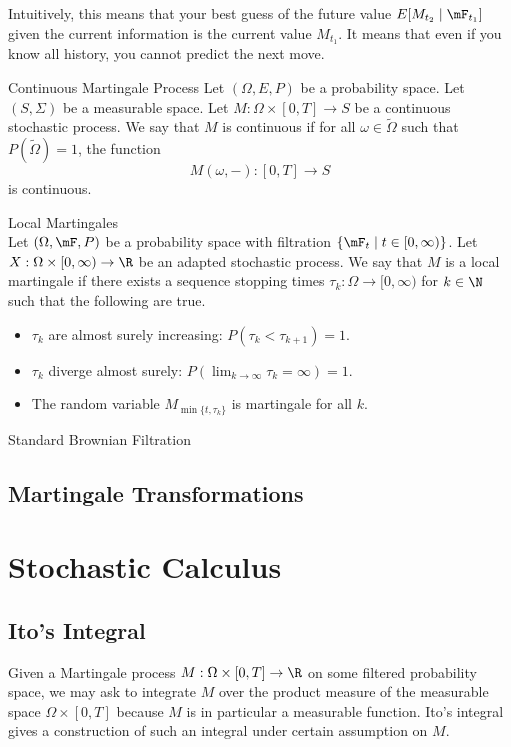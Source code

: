 \documentclass[a4paper]{article}
\begin{document}
Intuitively, this means that your best guess of the future value $E[M_{t_2}\;|\;\mF_{t_1}]$ given the current information is the current value $M_{t_1}$. It means that even if you know all history, you cannot predict the next move. 

\begin{defn}{Continuous Martingale Process}{} Let $(\Omega,E,P)$ be a probability space. Let $(S,\Sigma)$ be a measurable space. Let $M:\Omega\times[0,T]\to S$ be a continuous stochastic process. We say that $M$ is continuous if for all $\omega\in\widetilde{\Omega}$ such that $P(\widetilde{\Omega})=1$, the function $$M(\omega,-):[0,T]\to S$$ is continuous. 
\end{defn}

\begin{defn}{Local Martingales}{}\\
Let $(\Omega,\mF,P)$ be a probability space with filtration $\{\mF_t\;|\;t\in[0,\infty)\}$. Let $X:\Omega\times[0,\infty)\to\R$ be an adapted stochastic process. We say that $M$ is a local martingale if there exists a sequence stopping times $\tau_k:\Omega\to[0,\infty)$ for $k\in\N$ such that the following are true. 
\begin{itemize}
\item $\tau_k$ are almost surely increasing: $P(\tau_k<\tau_{k+1})=1$. 
\item $\tau_k$ diverge almost surely: $P(\lim_{k\to\infty}\tau_k=\infty)=1$. 
\item The random variable $M_{\min\{t,\tau_k\}}$ is martingale for all $k$. 
\end{itemize}
\end{defn}

\begin{defn}{Standard Brownian Filtration}{}
\end{defn}

\subsection{Martingale Transformations}

\pagebreak
\section{Stochastic Calculus}
\subsection{Ito's Integral}
Given a Martingale process $M:\Omega\times[0,T]\to\R$ on some filtered probability space, we may ask to integrate $M$ over the product measure of the measurable space $\Omega\times[0,T]$ because $M$ is in particular a measurable function. Ito's integral gives a construction of such an integral under certain assumption on $M$. 
\end{document}
